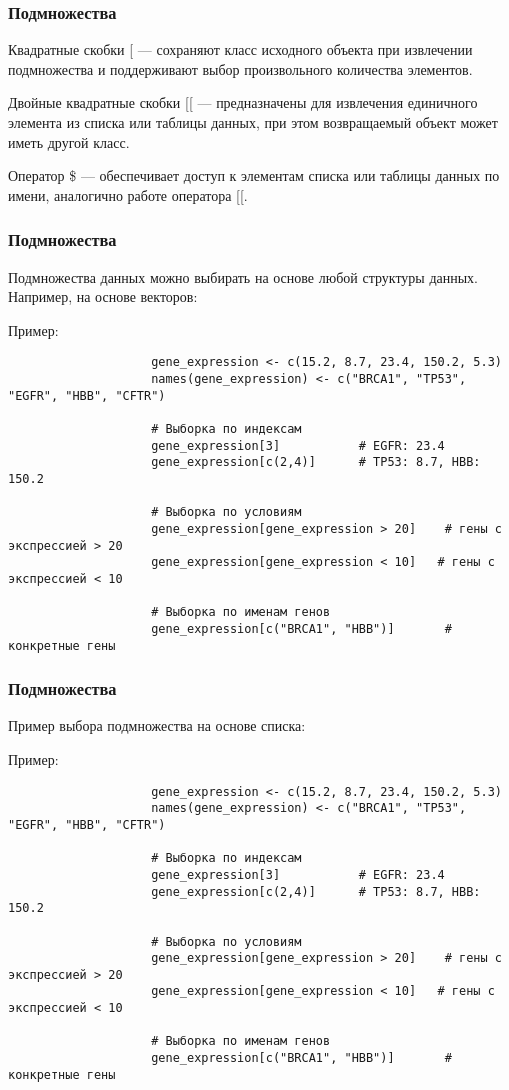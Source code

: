 \documentclass[10pt]{beamer}
\begin{document}
	
	\begin{frame}[fragile]
		\frametitle{Подмножества}
		Квадратные скобки [ — сохраняют класс исходного объекта при извлечении подмножества и поддерживают выбор произвольного количества элементов.
		
		Двойные квадратные скобки [[ — предназначены для извлечения единичного элемента из списка или таблицы данных, при этом возвращаемый объект может иметь другой класс.
		
		Оператор \$ — обеспечивает доступ к элементам списка или таблицы данных по имени, аналогично работе оператора [[.
		
		
		
	\end{frame}
	
	
	\begin{frame}[fragile]
		\frametitle{Подмножества}
		Подмножества данных можно выбирать на основе любой структуры данных. Например, на основе векторов:
		{\fontsize{8}{9}\selectfont
			\begin{exampleblock}{Пример:}
				\begin{verbatim}
					gene_expression <- c(15.2, 8.7, 23.4, 150.2, 5.3)
					names(gene_expression) <- c("BRCA1", "TP53", "EGFR", "HBB", "CFTR")
					
					# Выборка по индексам
					gene_expression[3]           # EGFR: 23.4
					gene_expression[c(2,4)]      # TP53: 8.7, HBB: 150.2
					
					# Выборка по условиям
					gene_expression[gene_expression > 20]    # гены с экспрессией > 20
					gene_expression[gene_expression < 10]   # гены с экспрессией < 10
					
					# Выборка по именам генов
					gene_expression[c("BRCA1", "HBB")]       # конкретные гены\end{verbatim}
			\end{exampleblock}
		}	
	\end{frame}
	
	\begin{frame}[fragile]
		\frametitle{Подмножества}
		Пример выбора подмножества на основе списка:
		{\fontsize{8}{9}\selectfont
			\begin{exampleblock}{Пример:}
				\begin{verbatim}
					gene_expression <- c(15.2, 8.7, 23.4, 150.2, 5.3)
					names(gene_expression) <- c("BRCA1", "TP53", "EGFR", "HBB", "CFTR")
					
					# Выборка по индексам
					gene_expression[3]           # EGFR: 23.4
					gene_expression[c(2,4)]      # TP53: 8.7, HBB: 150.2
					
					# Выборка по условиям
					gene_expression[gene_expression > 20]    # гены с экспрессией > 20
					gene_expression[gene_expression < 10]   # гены с экспрессией < 10
					
					# Выборка по именам генов
					gene_expression[c("BRCA1", "HBB")]       # конкретные гены\end{verbatim}
			\end{exampleblock}
		}
		
		
	\end{frame}
	
\end{document}
